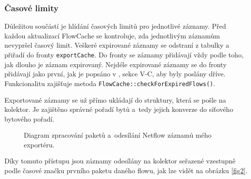 \documentclass[a4paper, 11pt]{article}
\begin{document}
\begin{sloppypar}
\subsubsection*{Časové limity} \label{timelimits}
Důležitou součástí je hlídání časových limitů pro jednotlivé záznamy. Před každou aktualizací FlowCache se kontroluje, zda jednotlivým záznamům nevypršel časový limit. Veškeré expirované záznamy se odstraní z tabulky a přiřadí do fronty \verb|exportCache|. Do fronty se záznamy přidávají vždy podle toho, jak dlouho je záznam expirovaný. Nejdéle expirované záznamy se do fronty přidávají jako první, jak je popsáno v  \cite{flows}, sekce V-C, aby byly poslány dříve. Funkcionalitu zajišťuje metoda \texttt{FlowCache::checkForExpiredFlows()}.

Exportované záznamy se už přímo ukládají do struktury, která se pošle na kolektor. Je zajištěno správné pořadí bytů a~tedy jejich konverze do síťového bytového pořadí.


\begin{figure}[ht]
    \begin{center}
        \caption{Diagram zpracování paketů a~odesílání Netflow záznamů mého exportéru.}
        \label{fig1}
    \end{center}
\end{figure}

Díky tomuto přístupu jsou záznamy odesílány na kolektor seřazené vzestupně podle časové značku prvního paketu daného flowu, jak lze vidět na obrázku \ref{fig2}.


\end{sloppypar}
\end{document}
